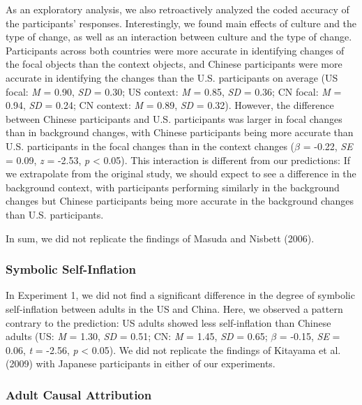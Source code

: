 \documentclass[
  man,floatsintext]{apa6}
\begin{document}
As an exploratory analysis, we also retroactively analyzed the coded accuracy of the participants' responses. Interestingly, we found main effects of culture and the type of change, as well as an interaction between culture and the type of change. Participants across both countries were more accurate in identifying changes of the focal objects than the context objects, and Chinese participants were more accurate in identifying the changes than the U.S. participants on average (US focal: \emph{M} = 0.90, \emph{SD} = 0.30; US context: \emph{M} = 0.85, \emph{SD} = 0.36; CN focal: \emph{M} = 0.94, \emph{SD} = 0.24; CN context: \emph{M} = 0.89, \emph{SD} = 0.32). However, the difference between Chinese participants and U.S. participants was larger in focal changes than in background changes, with Chinese participants being more accurate than U.S. participants in the focal changes than in the context changes (\(\beta\) = -0.22, \emph{SE} = 0.09, \emph{z} = -2.53, \emph{p} \textless{} 0.05). This interaction is different from our predictions: If we extrapolate from the original study, we should expect to see a difference in the background context, with participants performing similarly in the background changes but Chinese participants being more accurate in the background changes than U.S. participants.

In sum, we did not
replicate the findings of Masuda and Nisbett (2006).

\hypertarget{symbolic-self-inflation-3}{%
\subsubsection{Symbolic Self-Inflation}\label{symbolic-self-inflation-3}}

In Experiment 1, we did not find a significant difference in the degree of symbolic self-inflation between adults in the US and China. Here, we observed a pattern contrary to the prediction: US adults showed less self-inflation than Chinese adults (US: \emph{M} = 1.30, \emph{SD} = 0.51; CN: \emph{M} = 1.45, \emph{SD} = 0.65; \(\beta\) = -0.15, \emph{SE} = 0.06, \emph{t} = -2.56, \emph{p} \textless{} 0.05). We did not replicate the findings of Kitayama et al. (2009) with Japanese participants in either of our experiments.

\hypertarget{adult-causal-attribution-1}{%
\subsubsection{Adult Causal Attribution}\label{adult-causal-attribution-1}}
\end{document}
